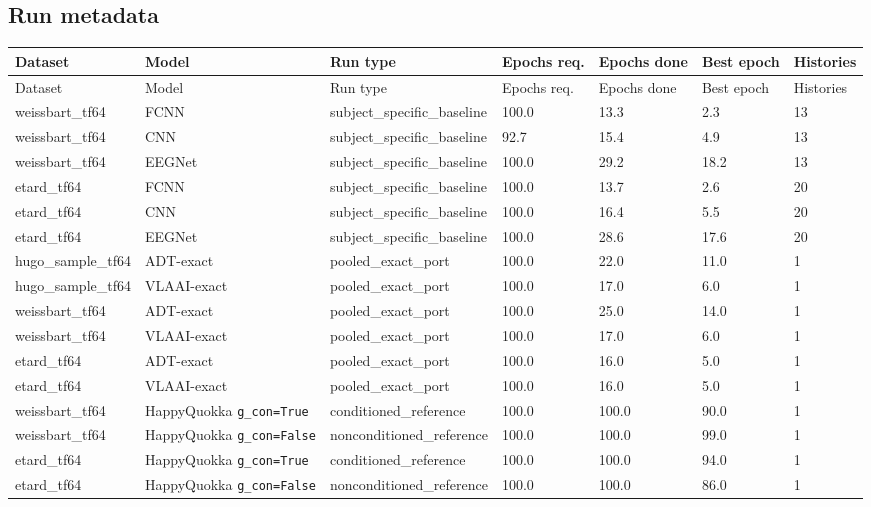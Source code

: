 \documentclass[11pt]{article}
\begin{document}
\subsection*{Run metadata}
\begin{longtable}{p{2.1cm} p{1.7cm} p{3.0cm} p{1.5cm} p{1.7cm} p{1.5cm} p{1.2cm}}
\toprule
Dataset & Model & Run type & Epochs req. & Epochs done & Best epoch & Histories \\
\midrule
\endfirsthead
\toprule
Dataset & Model & Run type & Epochs req. & Epochs done & Best epoch & Histories \\
\midrule
\endhead
weissbart\_tf64 & FCNN & subject\_specific\_baseline & 100.0 & 13.3 & 2.3 & 13 \\
weissbart\_tf64 & CNN & subject\_specific\_baseline & 92.7 & 15.4 & 4.9 & 13 \\
weissbart\_tf64 & EEGNet & subject\_specific\_baseline & 100.0 & 29.2 & 18.2 & 13 \\
etard\_tf64 & FCNN & subject\_specific\_baseline & 100.0 & 13.7 & 2.6 & 20 \\
etard\_tf64 & CNN & subject\_specific\_baseline & 100.0 & 16.4 & 5.5 & 20 \\
etard\_tf64 & EEGNet & subject\_specific\_baseline & 100.0 & 28.6 & 17.6 & 20 \\
hugo\_sample\_tf64 & ADT-exact & pooled\_exact\_port & 100.0 & 22.0 & 11.0 & 1 \\
hugo\_sample\_tf64 & VLAAI-exact & pooled\_exact\_port & 100.0 & 17.0 & 6.0 & 1 \\
weissbart\_tf64 & ADT-exact & pooled\_exact\_port & 100.0 & 25.0 & 14.0 & 1 \\
weissbart\_tf64 & VLAAI-exact & pooled\_exact\_port & 100.0 & 17.0 & 6.0 & 1 \\
etard\_tf64 & ADT-exact & pooled\_exact\_port & 100.0 & 16.0 & 5.0 & 1 \\
etard\_tf64 & VLAAI-exact & pooled\_exact\_port & 100.0 & 16.0 & 5.0 & 1 \\
weissbart\_tf64 & HappyQuokka \texttt{g\_con=True} & conditioned\_reference & 100.0 & 100.0 & 90.0 & 1 \\
weissbart\_tf64 & HappyQuokka \texttt{g\_con=False} & nonconditioned\_reference & 100.0 & 100.0 & 99.0 & 1 \\
etard\_tf64 & HappyQuokka \texttt{g\_con=True} & conditioned\_reference & 100.0 & 100.0 & 94.0 & 1 \\
etard\_tf64 & HappyQuokka \texttt{g\_con=False} & nonconditioned\_reference & 100.0 & 100.0 & 86.0 & 1 \\
\bottomrule
\end{longtable}
\end{document}
